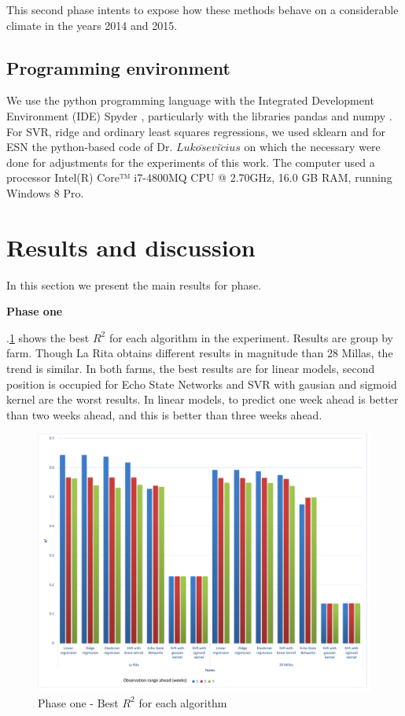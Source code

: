 \documentclass[review]{elsarticle}
\begin{document}
This second phase intents to expose how these methods behave on a considerable climate in the years 2014 and 2015.

\subsection{Programming environment}

We use the python programming language with the Integrated Development Environment (IDE) Spyder \citep{Continuum2015}, particularly with the libraries pandas \citep{mckinneypandas2010} and numpy \citep{vanderWalt2011}. For SVR, ridge and ordinary least squares regressions, we used sklearn \citep{scikitlearn2011} and for ESN the python-based code of Dr. $Luko\breve{s} evi \breve{c} ius$ \citep{Lukose2012} on which the necessary were done for adjustments for the experiments of this work. The computer used a processor Intel(R) Core™ i7-4800MQ CPU @ 2.70GHz, 16.0 GB RAM, running Windows 8 Pro.

\section{Results and discussion}

In this section we present the main results for phase.

{\bf Phase one } 

\figurename $.$\ref{figura4} shows the best $R^2$ for each algorithm in the experiment. Results are group by farm. Though La Rita obtains different results in magnitude than 28 Millas, the trend is similar. In both farms, the best results are for linear models, second position is occupied for Echo State Networks and  SVR with gausian and sigmoid kernel are the worst results. In linear models, to predict one week ahead is better than two weeks ahead, and this is better than three weeks ahead. 

\begin{figure}[H] 
 \centering
 \includegraphics[scale=.5]{Phase_one_Best_R2_for_each_algortihm}
 \caption{Phase one - Best $R^2$ for each algorithm} 
 \label{figura4} 
\end{figure}
\end{document}
